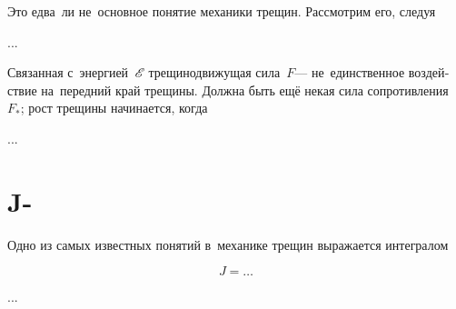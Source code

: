 \begin{otherlanguage}{russian}

Это едва~ли не~основное понятие механики трещин.
Рассмотрим его, следуя

...



\end{otherlanguage}



\begin{otherlanguage}{russian}

Связанная
с~энергией~${\mathscr{E}\hspace{-0.2ex}}$
трещинодвижущая сила~$F$\:---
не~единственное
воздействие
на~передний край
трещины.
Должна быть ещё
некая
сила сопротивления~$F_{*}$;
рост
трещины
начинается,
когда

...



\end{otherlanguage}

\section{J-}






\begin{otherlanguage}{russian}

Одно из самых известных понятий в~механике трещин выражается интегралом

\nopagebreak\vspace{-0.2em}\begin{equation}
J = \ldots
\end{equation}

...



\end{otherlanguage}

